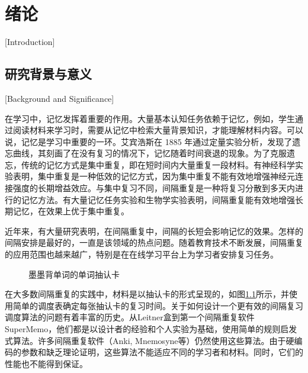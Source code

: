 
\chapter{绪论}[Introduction]

\section{研究背景与意义}[Background and Significance]

在学习中，记忆发挥着重要的作用。大量基本认知任务依赖于记忆，例如，学生通过阅读材料来学习时，需要从记忆中检索大量背景知识，才能理解材料内容\cite{reisbergCognitionExploringScience2019}。可以说，记忆是学习中重要的一环。艾宾浩斯在 1885 年通过定量实验分析，发现了遗忘曲线，其刻画了在没有复习的情况下，记忆随着时间衰退的现象\cite{ebbinghausMemoryContributionExperimental1913}。为了克服遗忘，传统的记忆方式是集中重复，即在短时间内大量重复一段材料。有神经科学实验表明，集中重复是一种低效的记忆方式，因为集中重复不能有效地增强神经元连接强度的长期增益效应\cite{kramarSynapticEvidenceEfficacy2012}。与集中复习不同，间隔重复是一种将复习分散到多天内进行的记忆方法。有大量记忆任务实验\cite{cepedaDistributedPracticeVerbal2006}和生物学实验\cite{smolenRightTimeLearn2016}表明，间隔重复能有效地增强长期记忆，在效果上优于集中重复。

近年来，有大量研究表明，在间隔重复中，间隔的长短会影响记忆的效果。怎样的间隔安排是最好的，一直是该领域的热点问题。随着教育技术不断发展，间隔重复的应用范围也越来越广，特别是在在线学习平台上为学习者安排复习任务。

\begin{figure}[htbp]
    \setlength{\subfigcapskip}{-1bp}
    \centering
    \begin{minipage}{\textwidth}
    \centering
    \subfigure{\label{fig:flashcard:front}}\addtocounter{subfigure}{-2}
    \hspace{2em}
    \subfigure{\label{fig:flashcard:back}}\addtocounter{subfigure}{-2}
    \end{minipage}
    \caption{墨墨背单词的单词抽认卡}
    \label{fig:flashcard}
\end{figure}

在大多数间隔重复的实践中，材料是以抽认卡的形式呈现的，如图\ref{fig:flashcard}所示，并使用简单的调度表确定每张抽认卡的复习时间。关于如何设计一个更有效的间隔复习调度算法的问题有着丰富的历史。从Leitner盒到第一个间隔重复软件SuperMemo，他们都是以设计者的经验和个人实验为基础，使用简单的规则启发式算法。许多间隔重复软件（Anki, Mnemosyne等）仍然使用这些算法。由于硬编码的参数和缺乏理论证明，这些算法不能适应不同的学习者和材料。同时，它们的性能也不能得到保证。

